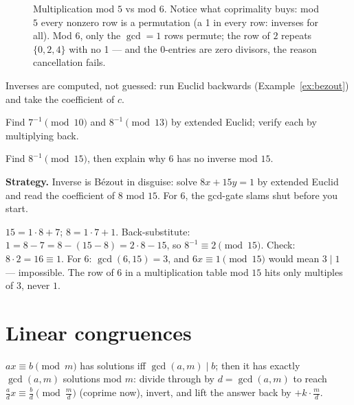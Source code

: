 \begin{figure}[ht]\centering

\caption{Multiplication mod $5$ vs mod $6$. Notice what coprimality buys:
mod $5$ every nonzero row is a permutation (a 1 in every row: inverses for
all). Mod $6$, only the $\gcd = 1$ rows permute; the row of $2$ repeats
$\{0,2,4\}$ with no 1 --- and the $0$-entries are zero divisors, the reason
cancellation fails.}
\label{fig:units}
\end{figure}

Inverses are computed, not guessed: run Euclid backwards
(Example~\ref{ex:bezout}) and take the coefficient of $c$.

\begin{exercise}[medium]\label{exr:inverse}
Find $7^{-1} \pmod{10}$ and $8^{-1} \pmod{13}$ by extended Euclid; verify
each by multiplying back.
\end{exercise}

\begin{example}\label{ex:inverse8}
Find $8^{-1} \pmod{15}$, then explain why $6$ has no inverse mod $15$.
\par\smallskip
\textbf{Strategy.} Inverse is B\'ezout in disguise: solve
$8x + 15y = 1$ by extended Euclid and read the coefficient of $8$ mod $15$.
For $6$, the gcd-gate slams shut before you start.
\par\smallskip
\begin{solution}
$15 = 1\cdot8 + 7$; $8 = 1\cdot7 + 1$. Back-substitute:
$1 = 8 - 7 = 8 - (15 - 8) = 2\cdot8 - 15$, so $8^{-1} \equiv 2
\pmod{15}$. Check: $8\cdot2 = 16 \equiv 1$. For $6$: $\gcd(6,15) = 3$, and
$6x \equiv 1 \pmod{15}$ would mean $3 \mid 1$ --- impossible. The row of
$6$ in a multiplication table mod $15$ hits only multiples of $3$, never
$1$.
\end{solution}
\end{example}

\section{Linear congruences}\label{sec:lincong}

\begin{theorem}
$ax \equiv b \pmod m$ has solutions iff $\gcd(a,m) \mid b$; then it has
exactly $\gcd(a,m)$ solutions mod $m$: divide through by $d =
\gcd(a,m)$ to reach $\frac{a}{d}x \equiv \frac{b}{d} \pmod{\frac{m}{d}}$
(coprime now), invert, and lift the answer back by $+k\cdot\frac{m}{d}$.
\end{theorem}

